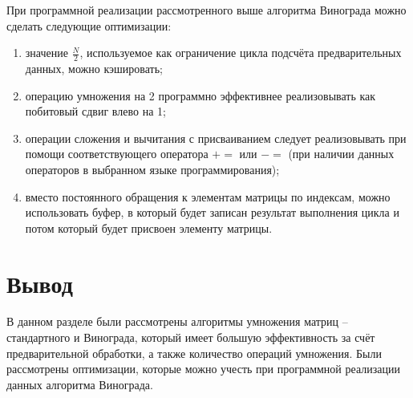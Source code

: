 При программной реализации рассмотренного выше алгоритма Винограда можно сделать 
следующие оптимизации:
\begin{enumerate}
	\item значение $\frac{N}{2}$, используемое как ограничение цикла подсчёта предварительных
        данных, можно кэшировать;
	\item операцию умножения на 2 программно эффективнее реализовывать как побитовый сдвиг 
        влево на 1;
	\item операции сложения и вычитания с присваиванием следует реализовывать при помощи 
        соответствующего оператора $+=$ или $-=$ (при наличии данных операторов в выбранном 
        языке программирования);
    \item вместо постоянного обращения к элементам матрицы по индексам, можно использовать буфер, 
        в который будет записан результат выполнения цикла и потом который будет присвоен
        элементу матрицы.
\end{enumerate}

\section{Вывод}
В данном разделе были рассмотрены алгоритмы умножения матриц – стандартного и Винограда, 
который имеет большую эффективность за счёт предварительной обработки, а также количество операций умножения. 
Были рассмотрены оптимизации, которые можно учесть при программной реализации данных
алгоритма Винограда.

\clearpage
